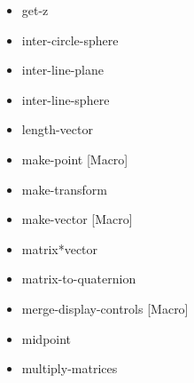 \documentclass [11pt]{book}
\begin{document}
\begin{itemize}
\item {}get-z





\item {}inter-circle-sphere





\item {}inter-line-plane





\item {}inter-line-sphere





\item {}length-vector





\item {}make-point [Macro]





\item {}make-transform





\item {}make-vector [Macro]





\item {}matrix*vector





\item {}matrix-to-quaternion





\item {}merge-display-controls [Macro]





\item {}midpoint





\item {}multiply-matrices






\end{itemize}
\end{document}
